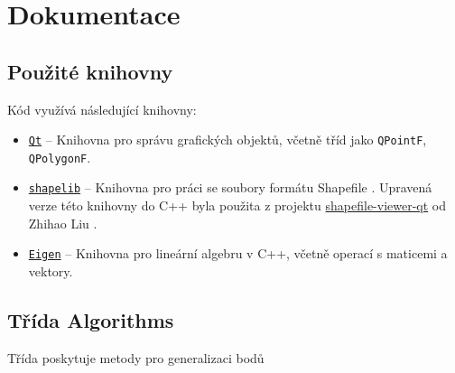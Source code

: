 \section{Dokumentace}

\subsection{Použité knihovny}
Kód využívá následující knihovny:
\begin{itemize}
\item \texttt{\href{https://www.qt.io/}{Qt}} – Knihovna pro správu grafických objektů, včetně tříd jako \texttt{QPointF}, \texttt{QPolygonF}.
\item \texttt{\href{http://shapelib.maptools.org/}{shapelib}} – Knihovna pro práci se soubory formátu Shapefile \cite{shapelib}. Upravená verze této knihovny do C++ byla použita z projektu \href{https://github.com/zhihao-liu/shapefile-viewer-qt/tree/master/shapelib}{shapefile-viewer-qt} od Zhihao Liu \cite{liu2025shapelib}.
\item \texttt{\href{https://gitlab.com/libeigen/eigen}{Eigen}} – Knihovna pro lineární algebru v C++, včetně operací s maticemi a vektory\cite{eigen}.
\end{itemize}

\subsection{Třída Algorithms}
Třída poskytuje metody pro generalizaci bodů

